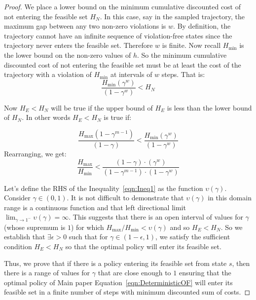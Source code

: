 \documentclass{article}
\theoremstyle{definition}
\begin{document}
\begin{proof}
    We place a lower bound on the minimum cumulative discounted cost of not entering the feasible set $H_N$. In this case, say in the sampled trajectory, the maximum gap between any two non-zero violations is $w$. By definition, the trajectory cannot have an infinite sequence of violation-free states since the trajectory never enters the feasible set. Therefore $w$ is finite. Now recall $H_{\min}$ is the lower bound on the non-zero values of $h$. So the minimum cumulative discounted cost of not entering the feasible set must be at least the cost of the trajectory with a violation of $H_{\min}$ at intervals of $w$ steps. That is:
    \begin{equation*}
        \frac{H_{\min}(\gamma^{w})}{(1-\gamma^{w})} < H_N
    \end{equation*}

    Now $H_E < H_N$ will be true if the upper bound of $H_E$ is less than the lower bound of $H_N$. In other words $H_E < H_N$ is true if:
    
    \begin{equation}
        \frac{H_{\max}(1-\gamma^{m-1})}{(1-\gamma)} < \frac{H_{\min}(\gamma^{w})}{(1-\gamma^{w})}
    \end{equation}
    Rearranging, we get:
    \begin{equation}
    \label{eqn:Ineq1}
        \frac{H_{\max}}{H_{\min}} < \frac{(1-\gamma)\cdot (\gamma^{w})}{(1-\gamma^{m-1})\cdot(1-\gamma^{w})} 
    \end{equation}
    
    Let's define the RHS of the Inequality~\ref{eqn:Ineq1} as the function $\upsilon(\gamma)$. Consider $\gamma\in(0,1)$. It is not difficult to demonstrate that $\upsilon(\gamma)$ in this domain range is a continuous function and that left directional limit $\lim_{\gamma \to 1^{-}} \upsilon(\gamma)=\infty$. This suggests that there is an open interval of values for $\gamma$ (whose supremum is $1$) for which $H_{\max}/H_{\min} < \upsilon(\gamma)$ and so $H_E < H_N$. So we establish that $\exists \epsilon>0$ such that for $\gamma\in (1-\epsilon,1)$, we satisfy the sufficient condition $H_E < H_N$ so that the optimal policy will enter its feasible set.
    

    Thus, we prove that if there is a policy entering its feasible set from state $s$, then there is a range of values for $\gamma$ that are close enough to $1$ ensuring that the optimal policy of Main paper Equation~\ref{eqn:DeterministicOF} will enter its feasible set in a finite number of steps with minimum discounted sum of costs.

    
    

\end{proof}
\end{document}
